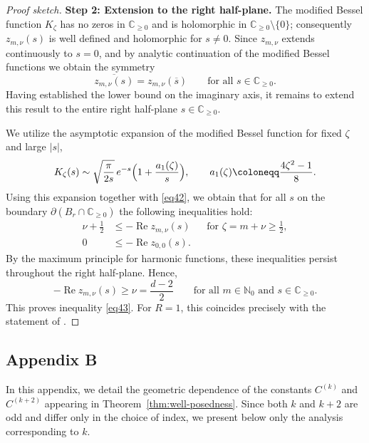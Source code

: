 \documentclass[12pt,reqno]{amsart}
\numberwithin{equation}{section}
\begin{document}
\begin{proof}[Proof sketch]
\smallskip\noindent\textbf{Step 2: Extension to the right half-plane.}
The modified Bessel function $K_\zeta$ has no zeros in $\mathbb{C}_{\ge 0}$
and is holomorphic in $\mathbb{C}_{\ge 0} \setminus \{0\}$; consequently $z_{m,\nu}(s)$ is well defined and holomorphic for
$s\neq 0$. Since $z_{m,\nu}$ extends continuously to $s=0$, and by analytic continuation of the modified Bessel functions we obtain the symmetry
\begin{equation}\label{eq42}
    \overline{z_{m,\nu}(s)} = z_{m,\nu}(\overline{s}) \qquad \text{for all } s \in \mathbb{C}_{\ge 0}.
\end{equation}
Having established the lower bound on the imaginary axis, it remains to extend this result to the entire right half-plane $s \in \mathbb{C}_{\ge 0}$. 

We utilize the asymptotic expansion of the modified Bessel function for fixed $\zeta$ and large $|s|$,
\begin{equation*}
    K_\zeta(s) \sim \sqrt{\frac{\pi}{2s}} \, e^{-s} \Bigl( 1 + \frac{a_1(\zeta)}{s} \Bigr), \qquad
    a_1(\zeta) \coloneqq \frac{4\zeta^2 - 1}{8}.
\end{equation*}
Using this expansion together with \eqref{eq42}, we obtain that for all $s$ on the boundary $\partial(B_r \cap \mathbb{C}_{\ge 0})$ the following
inequalities hold:
\begin{equation*}
\begin{aligned}
    \nu + \frac{1}{2} &\le - \operatorname{Re} z_{m,\nu}(s) && \text{for } \zeta = m+\nu \ge \frac{1}{2}, \\[4pt]
    0 &\le - \operatorname{Re} z_{0,0}(s).
\end{aligned}
\end{equation*}
By the maximum principle for harmonic functions, these inequalities persist throughout the  right half-plane. Hence,
\begin{equation*}
    - \operatorname{Re} z_{m,\nu}(s) \ge \nu = \frac{d-2}{2} \qquad \text{for all } m \in \mathbb{N}_0 \text{ and } s \in \mathbb{C}_{\ge 0}.
\end{equation*}
This proves inequality \eqref{eq43}. For $R=1$, this coincides precisely with the statement of \cite[Theorem 3.4]{gräßle2025}.



\end{proof}

\subsection{Appendix B}\label{appendixB}
In this appendix, we detail the geometric dependence of the constants $C^{(k)}$ and $C^{(k+2)}$ appearing in Theorem~\ref{thm:well-posedness}. Since both $k$ and $k+2$ are odd and differ only in the choice of index, we present below only the analysis corresponding to $k$.
\end{document}
